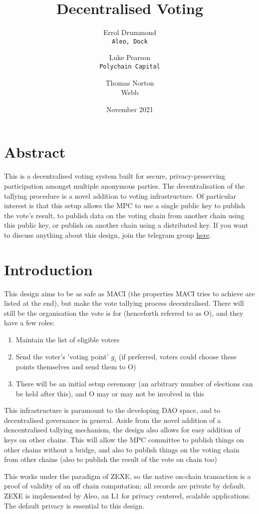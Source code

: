 \documentclass{article}
\title{Decentralised Voting}
\author{Errol Drummond\\ \texttt{Aleo, Dock}\\ \and 
 Luke Pearson\\ \texttt{Polychain Capital} \and
 Thomas Norton \\ Webb}
\date{November 2021}
\begin{document}
\maketitle
\section{Abstract}
This is a decentralised voting system built for secure, privacy-preserving participation amongst multiple anonymous parties. The decentralisation of the tallying procedure is a novel addition to voting infrastructure. Of particular interest is that this setup allows the MPC to use a single public key to publish the vote's result, to publish data on the voting chain from another chain using this public key, or publish on another chain using a distributed key. If you want to discuss anything about this design, join the telegram group \href{https://t.me/joinchat/5tZhfUWRwacwNzZk}{here}.

\section{Introduction}
This design aims to be as safe as MACI (the properties MACI tries to achieve are listed at the end), but make the vote tallying process decentralised. There will still be the organisation the vote is for (henceforth referred to as O), and they have a few roles:
\begin{enumerate}
    \item Maintain the list of eligible voters
    \item Send the voter's 'voting point' $g_i$ (if preferred, voters could choose these points themselves and send them to O)
    \item There will be an initial setup ceremony (an arbitrary number of elections can be held after this), and O may or may not be involved in this
\end{enumerate}

This infrastructure is paramount to the developing DAO space, and to decentralised governance in general. Aside from the novel addition of a dencentralised tallying mechanism, the design also allows for easy addition of keys on other chains. This will allow the MPC committee to publish things on other chains without a bridge, and also to publish things on the voting chain from other chains (also to publish the result of the vote on chain too)

This works under the paradigm of ZEXE, so the native on-chain transaction is a proof of validity of an off chain computation; all records are private by default. ZEXE is implemented by Aleo, an L1 for privacy centered, scalable applications. The default privacy is essential to this design.
\end{document}
